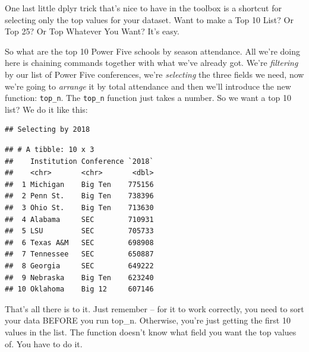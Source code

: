 \documentclass[]{book}
\newenvironment{Shaded}{\begin{snugshade}}{\end{snugshade}}
\newcommand{\KeywordTok}[1]{\textcolor[rgb]{0.13,0.29,0.53}{\textbf{#1}}}
\newcommand{\DataTypeTok}[1]{\textcolor[rgb]{0.13,0.29,0.53}{#1}}
\newcommand{\DecValTok}[1]{\textcolor[rgb]{0.00,0.00,0.81}{#1}}
\newcommand{\StringTok}[1]{\textcolor[rgb]{0.31,0.60,0.02}{#1}}
\newcommand{\OperatorTok}[1]{\textcolor[rgb]{0.81,0.36,0.00}{\textbf{#1}}}
\newcommand{\NormalTok}[1]{#1}
\begin{document}
One last little dplyr trick that's nice to have in the toolbox is a
shortcut for selecting only the top values for your dataset. Want to
make a Top 10 List? Or Top 25? Or Top Whatever You Want? It's easy.

So what are the top 10 Power Five schools by season attendance. All
we're doing here is chaining commands together with what we've already
got. We're \emph{filtering} by our list of Power Five conferences, we're
\emph{selecting} the three fields we need, now we're going to
\emph{arrange} it by total attendance and then we'll introduce the new
function: \texttt{top\_n}. The \texttt{top\_n} function just takes a
number. So we want a top 10 list? We do it like this:

\begin{Shaded}
\end{Shaded}

\begin{verbatim}
## Selecting by 2018
\end{verbatim}

\begin{verbatim}
## # A tibble: 10 x 3
##    Institution Conference `2018`
##    <chr>       <chr>       <dbl>
##  1 Michigan    Big Ten    775156
##  2 Penn St.    Big Ten    738396
##  3 Ohio St.    Big Ten    713630
##  4 Alabama     SEC        710931
##  5 LSU         SEC        705733
##  6 Texas A&M   SEC        698908
##  7 Tennessee   SEC        650887
##  8 Georgia     SEC        649222
##  9 Nebraska    Big Ten    623240
## 10 Oklahoma    Big 12     607146
\end{verbatim}

That's all there is to it. Just remember -- for it to work correctly,
you need to sort your data BEFORE you run top\_n. Otherwise, you're just
getting the first 10 values in the list. The function doesn't know what
field you want the top values of. You have to do it.
\end{document}
